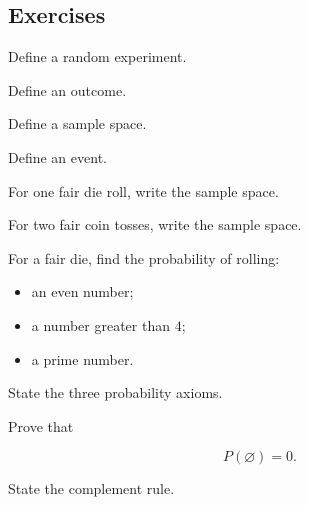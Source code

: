 \subsection{Exercises}
\label{subsec:elementary-probability-exercises}

\begin{exercise}[1]
Define a random experiment.
\end{exercise}

\begin{exercise}[1]
Define an outcome.
\end{exercise}

\begin{exercise}[1]
Define a sample space.
\end{exercise}

\begin{exercise}[1]
Define an event.
\end{exercise}

\begin{exercise}[1]
For one fair die roll, write the sample space.
\end{exercise}

\begin{exercise}[1]
For two fair coin tosses, write the sample space.
\end{exercise}

\begin{exercise}[1]
For a fair die, find the probability of rolling:
\begin{itemize}
    \item an even number;
    \item a number greater than \(4\);
    \item a prime number.
\end{itemize}
\end{exercise}

\begin{exercise}[1]
State the three probability axioms.
\end{exercise}

\begin{exercise}[1]
Prove that

\[
P(\varnothing)=0.
\]
\end{exercise}

\begin{exercise}[1]
State the complement rule.
\end{exercise}

